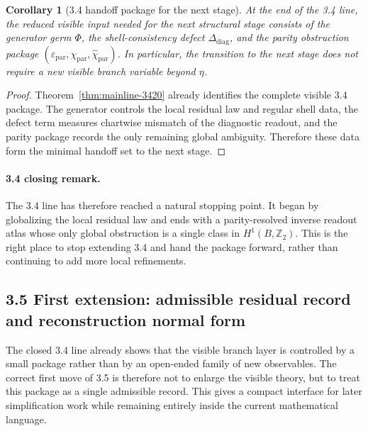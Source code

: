 \documentclass[12pt,a4paper]{article}
\newtheorem{corollary}[theorem]{Corollary}
\begin{document}
\begin{corollary}[3.4 handoff package for the next stage]
\label{cor:mainline-3420}
At the end of the 3.4 line, the reduced visible input needed for the next structural stage consists of the generator germ $\Phi$, the shell-consistency defect $\Delta_{\mathrm{diag}}$, and the parity obstruction package $(\varepsilon_{\mathrm{par}},\chi_{\mathrm{par}},\widehat\chi_{\mathrm{par}})$. In particular, the transition to the next stage does not require a new visible branch variable beyond $\eta$.
\end{corollary}

\begin{proof}
Theorem~\ref{thm:mainline-3420} already identifies the complete visible 3.4 package. The generator controls the local residual law and regular shell data, the defect term measures chartwise mismatch of the diagnostic readout, and the parity package records the only remaining global ambiguity. Therefore these data form the minimal handoff set to the next stage.
\end{proof}

\paragraph{3.4 closing remark.}
The 3.4 line has therefore reached a natural stopping point. It began by globalizing the local residual law and ends with a parity-resolved inverse readout atlas whose only global obstruction is a single class in $H^1(B,\mathbb Z_2)$. This is the right place to stop extending 3.4 and hand the package forward, rather than continuing to add more local refinements.



\subsection*{3.5 First extension: admissible residual record and reconstruction normal form}
The closed 3.4 line already shows that the visible branch layer is controlled by a small package rather than by an open-ended family of new observables. The correct first move of 3.5 is therefore not to enlarge the visible theory, but to treat this package as a single admissible record. This gives a compact interface for later simplification work while remaining entirely inside the current mathematical language.
\end{document}
